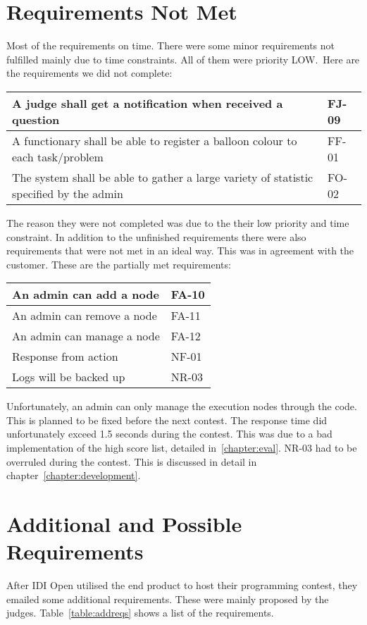 \section{Requirements Not Met}\label{section:reqNotMet}
Most of the requirements on time.
There were some minor requirements not fulfilled mainly due to time
constraints. All of them were priority LOW.\ Here are the requirements
we did not complete:

\begin{center}
\begin{longtable}{|p{5cm}|l|}
\hline
A judge shall get a notification when received a question & FJ-09\\\hline
A functionary shall be able to register a balloon colour to each task/problem &
FF-01\\\hline
The system shall be able to gather a large variety of statistic specified by
the admin & FO-02\\\hline
\end{longtable}
\end{center}

The reason they were not completed was due to the their low priority and
time constraint. In addition to the unfinished requirements there were also 
requirements that were not met in an ideal way.
This was in agreement with the customer. These are the partially met
requirements:

\begin{longtable}{|l|l|}
    \hline
    An admin can add a node & FA-10 \\
    \hline
    An admin can remove a node & FA-11 \\
    \hline
    An admin can manage a node & FA-12 \\
    \hline
    Response from action & NF-01 \\
    \hline
    Logs will be backed up & NR-03 \\
    \hline
\end{longtable}

Unfortunately, an admin can only manage the execution nodes through the
code. This is planned to be fixed before the next contest. The response
time did unfortunately exceed 1.5 seconds during the contest. This was
due to a bad implementation of the high score list, detailed
in~\ref{chapter:eval}. NR-03 had to be overruled during the contest. This is
discussed in detail in chapter~\ref{chapter:development}.

\section{Additional and Possible Requirements}
After IDI Open utilised the end product to host their programming contest, they
emailed some additional requirements. These were mainly proposed by the judges.
Table~\ref{table:addreqs} shows a list of the requirements.


